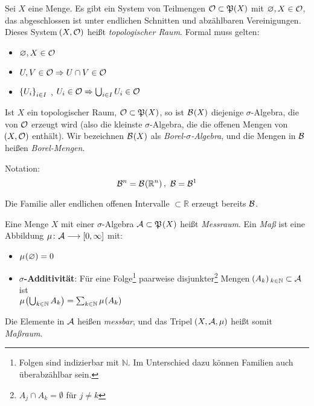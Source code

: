 \documentclass[skript.tex]{subfiles}
\begin{document}
	\begin{defin}
		Sei $X$ eine Menge. Es gibt ein System von Teilmengen $\mathcal{O} \subset \mathfrak{P}(X)$ mit $\varnothing,X \in \mathcal{O}$, das abgeschlossen ist unter endlichen Schnitten und abzählbaren Vereinigungen. Dieses System $\pr{X,\mc{O}}$ heißt \textit{topologischer Raum}. Formal muss gelten:
		\begin{itemize}
			\item $\varnothing, X \in \mathcal{O}$
			\item $U,V \in \mathcal{O} \Rightarrow U\cap V \in \mathcal{O}$
			\item $\left\{U_i\right\}_{i\in I}$ , $U_i \in \mathcal{O} \Rightarrow \bigcup_{i\in I} U_i \in \mathcal{O}$
		\end{itemize}
	\end{defin}
	
	\begin{defin}
		Ist $X$ ein topologischer Raum, $\mathcal{O}\subset \mathfrak{P}(X)$, so ist $\mc{B}\pr{X}$ diejenige $\sigma$-Algebra, die von $\mathcal{O}$ erzeugt wird (also die kleinste $\sigma$-Algebra, die die offenen Mengen von $\pr{X,\mc{O}}$ enthält). Wir bezeichnen $\mc{B}\pr{X}$ als \textit{Borel-$\sigma$-Algebra}, und die Mengen in $\mathcal{B}$ heißen \textit{Borel-Mengen}.
		
		Notation:
		\begin{equation*}
			\mc{B}^n = \mc{B}\pr{\mathbb{R}^n},\ \mc{B} = \mc{B}^1
		\end{equation*}
	\end{defin}

	\begin{bem*}
		Die Familie aller endlichen offenen Intervalle $\subset \mathbb{R}$ erzeugt bereits $\mathcal{B}$.
	\end{bem*}
	
	\begin{defin}
		Eine Menge $X$ mit einer $\sigma$-Algebra $\mc{A} \subset \mf{P}\pr{X}$ heißt \textit{Messraum}. Ein \textit{Maß} ist eine Abbildung $\mu\colon \mathcal{A} \longrightarrow \left[ 0, \infty \right]$ mit:
		\begin{itemize}
			\item $\mu\pr{\emptyset} = 0$
			\item \textbf{\boldmath$\sigma$-Additivität}: Für eine Folge\footnote{Folgen sind indizierbar mit $\mathbb{N}$. Im Unterschied dazu können Familien auch überabzählbar sein.} paarweise disjunkter\footnote{$A_j \cap A_k = \emptyset$ für $j\neq k$} Mengen $\pr{A_k}_{k\in \mathbb{N}} \subset \mc{A}$ ist \\ $\mu\pr{\bigcup_{k\in\mathbb{N}} A_k } = \sum_{k\in\mathbb{N}} \mu\pr{A_k}$
		\end{itemize}
		Die Elemente in $\mathcal{A}$ heißen \textit{messbar}, und das Tripel $\pr{X, \mc{A}, \mu}$ heißt somit \textit{Maßraum}.
	\end{defin}
	
\end{document}
